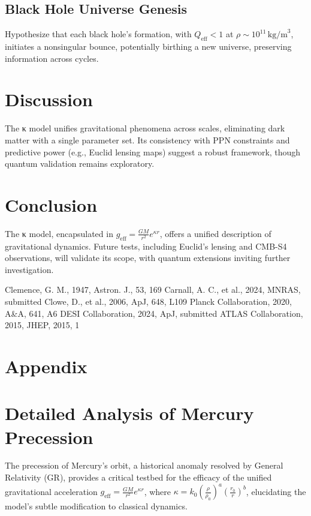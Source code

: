 \documentclass[a4paper,12pt]{article}
\begin{document}
\subsection{Black Hole Universe Genesis}
Hypothesize that each black hole’s formation, with \( Q_{\mathrm{eff}} < 1 \) at \( \rho \sim 10^{11} \, \text{kg/m}^3 \), initiates a nonsingular bounce, potentially birthing a new universe, preserving information across cycles.

\section{Discussion}
The κ model unifies gravitational phenomena across scales, eliminating dark matter with a single parameter set. Its consistency with PPN constraints and predictive power (e.g., Euclid lensing maps) suggest a robust framework, though quantum validation remains exploratory.

\section{Conclusion}
The κ model, encapsulated in \( g_{\mathrm{eff}} = \frac{G M}{r^2} e^{\kappa r} \), offers a unified description of gravitational dynamics. Future tests, including Euclid’s lensing and CMB-S4 observations, will validate its scope, with quantum extensions inviting further investigation.

\begin{thebibliography}{9}
 Clemence, G. M., 1947, Astron. J., 53, 169
 Carnall, A. C., et al., 2024, MNRAS, submitted
 Clowe, D., et al., 2006, ApJ, 648, L109
 Planck Collaboration, 2020, A&A, 641, A6
 DESI Collaboration, 2024, ApJ, submitted
 ATLAS Collaboration, 2015, JHEP, 2015, 1
\end{thebibliography}
\section{Appendix}
\section{Detailed Analysis of Mercury Precession}

The precession of Mercury's orbit, a historical anomaly resolved by General Relativity (GR), provides a critical testbed for the efficacy of the unified gravitational acceleration \( g_{\mathrm{eff}} = \frac{G M}{r^2} e^{\kappa r} \), where \( \kappa = k_0 \left( \frac{\rho}{\rho_0} \right)^a \left( \frac{r_0}{r} \right)^b \), elucidating the model's subtle modification to classical dynamics.
\end{document}
